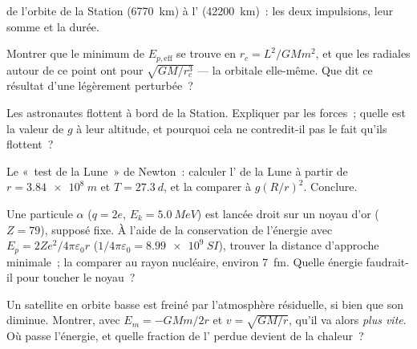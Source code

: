 \begin{exercise}[$\star\star$]\label{exo:b1:central-forces:7}
 de l'orbite de la Station (\qty{6770}{km}) à
l' (\qty{42200}{km})~: les deux impulsions, leur
somme et la durée.
\end{exercise}

\begin{exercise}[$\star\star$]\label{exo:b1:central-forces:8}
Montrer que le minimum de $E_{p,\mathrm{eff}}$ se trouve en
$r_c = L^2/GMm^2$, et que les  radiales autour de ce
point ont pour  $\sqrt{GM/r_c^3}$ --- la  orbitale
elle-même. Que dit ce résultat d'une  légèrement perturbée~?
\end{exercise}

\begin{exercise}[$\star\star$]\label{exo:b1:central-forces:9}
Les astronautes flottent à bord de la Station. Expliquer par les
forces~; quelle est la valeur de $g$ à leur altitude, et pourquoi cela
ne contredit-il pas le fait qu'ils flottent~?
\end{exercise}

\begin{exercise}[$\star\star\star$]\label{exo:b1:central-forces:10}
Le «~test de la Lune~» de Newton~: calculer l' de
la Lune à partir de $r = \qty{3.84e8}{m}$ et $T = \qty{27.3}{d}$, et la
comparer à $g(R/r)^2$. Conclure.
\end{exercise}

\begin{exercise}[$\star\star\star$]\label{exo:b1:central-forces:11}
Une particule $\alpha$ ($q = 2e$, $E_k = \qty{5.0}{MeV}$) est lancée
droit sur un noyau d'or ($Z = 79$), supposé fixe. À l'aide de la
conservation de l'énergie avec $E_p = 2Ze^2/4\pi\varepsilon_0r$
($1/4\pi\varepsilon_0 = \qty{8.99e9}{SI}$), trouver la distance
d'approche minimale~; la comparer au rayon nucléaire, environ
\qty{7}{fm}. Quelle énergie faudrait-il pour toucher le noyau~?
\end{exercise}

\begin{exercise}[$\star\star\star$]\label{exo:b1:central-forces:12}
Un satellite en orbite basse est freiné par l'atmosphère résiduelle, si
bien que son  diminue. Montrer, avec $E_m = -GMm/2r$ et
$v = \sqrt{GM/r}$, qu'il va alors \emph{plus vite}. Où passe l'énergie,
et quelle fraction de l' perdue devient de la chaleur~?
\end{exercise}

